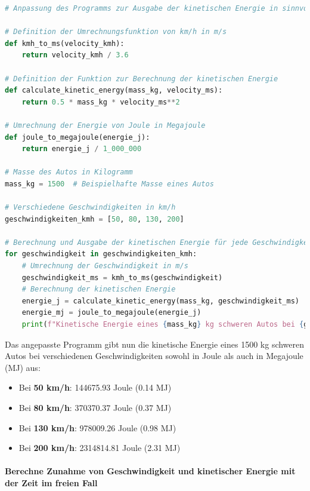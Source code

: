 \documentclass{vorlage-design-main}
\begin{document}
\begin{lstlisting}[language=Python]
# Anpassung des Programms zur Ausgabe der kinetischen Energie in sinnvollen Einheitengrößen (Joule und Megajoule)

# Definition der Umrechnungsfunktion von km/h in m/s
def kmh_to_ms(velocity_kmh):
    return velocity_kmh / 3.6

# Definition der Funktion zur Berechnung der kinetischen Energie
def calculate_kinetic_energy(mass_kg, velocity_ms):
    return 0.5 * mass_kg * velocity_ms**2

# Umrechnung der Energie von Joule in Megajoule
def joule_to_megajoule(energie_j):
    return energie_j / 1_000_000

# Masse des Autos in Kilogramm
mass_kg = 1500  # Beispielhafte Masse eines Autos

# Verschiedene Geschwindigkeiten in km/h
geschwindigkeiten_kmh = [50, 80, 130, 200]

# Berechnung und Ausgabe der kinetischen Energie für jede Geschwindigkeit in Joule und Megajoule
for geschwindigkeit in geschwindigkeiten_kmh:
    # Umrechnung der Geschwindigkeit in m/s
    geschwindigkeit_ms = kmh_to_ms(geschwindigkeit)
    # Berechnung der kinetischen Energie
    energie_j = calculate_kinetic_energy(mass_kg, geschwindigkeit_ms)
    energie_mj = joule_to_megajoule(energie_j)
    print(f"Kinetische Energie eines {mass_kg} kg schweren Autos bei {geschwindigkeit} km/h: {energie_j:.2f} Joule ({energie_mj:.2f} MJ)")
\end{lstlisting}

Das angepasste Programm gibt nun die kinetische Energie eines 1500 kg
schweren Autos bei verschiedenen Geschwindigkeiten sowohl in Joule als
auch in Megajoule (MJ) aus:

\begin{itemize}

\item
  Bei \textbf{50 km/h}: 144675.93 Joule (0.14 MJ)
\item
  Bei \textbf{80 km/h}: 370370.37 Joule (0.37 MJ)
\item
  Bei \textbf{130 km/h}: 978009.26 Joule (0.98 MJ)
\item
  Bei \textbf{200 km/h}: 2314814.81 Joule (2.31 MJ)
\end{itemize}

\hypertarget{berechne-zunahme-von-geschwindigkeit-und-kinetischer-energie-mit-der-zeit-im-freien-fall}{%
\paragraph{Berechne Zunahme von Geschwindigkeit und kinetischer Energie
mit der Zeit im freien
Fall}\label{berechne-zunahme-von-geschwindigkeit-und-kinetischer-energie-mit-der-zeit-im-freien-fall}}
\end{document}

